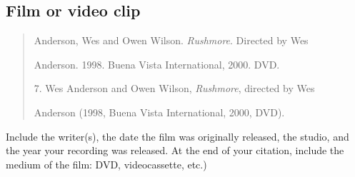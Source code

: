 \subsection{Film or video clip}

\begin{quote}

Anderson, Wes and Owen Wilson. \emph{Rushmore}. Directed by Wes 

\hspace{.4in}Anderson. 1998. Buena Vista International, 2000. DVD.

\medskip

\hspace{.4in}7. Wes Anderson and Owen Wilson, \emph{Rushmore}, directed by Wes 

Anderson (1998, Buena Vista International, 2000, DVD).

\end{quote}

 Include the writer(s), the date the film was originally released, the studio, and the year your recording was released. At the end of your citation, include the medium of the film: DVD, videocassette, etc.)







